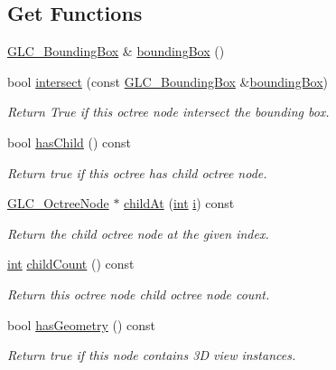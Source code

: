 \subsection*{Get Functions}
\begin{DoxyCompactItemize}
\item 
\hyperlink{class_g_l_c___bounding_box}{G\-L\-C\-\_\-\-Bounding\-Box} \& \hyperlink{class_g_l_c___octree_node_a6780e8d0e0921fc5b06f03ac7203fb32}{bounding\-Box} ()
\item 
bool \hyperlink{class_g_l_c___octree_node_a814178430344bc7b44f321d48d29043e}{intersect} (const \hyperlink{class_g_l_c___bounding_box}{G\-L\-C\-\_\-\-Bounding\-Box} \&\hyperlink{class_g_l_c___octree_node_a6780e8d0e0921fc5b06f03ac7203fb32}{bounding\-Box})
\begin{DoxyCompactList}\small\item\em Return True if this octree node intersect the bounding box. \end{DoxyCompactList}\item 
bool \hyperlink{class_g_l_c___octree_node_ac09f02f5e0cbcceed8763432ced8f670}{has\-Child} () const 
\begin{DoxyCompactList}\small\item\em Return true if this octree has child octree node. \end{DoxyCompactList}\item 
\hyperlink{class_g_l_c___octree_node}{G\-L\-C\-\_\-\-Octree\-Node} $\ast$ \hyperlink{class_g_l_c___octree_node_aeadda83184cd8feb9852355bfe5e9021}{child\-At} (\hyperlink{ioapi_8h_a787fa3cf048117ba7123753c1e74fcd6}{int} \hyperlink{uavobjecttemplate_8m_a6f6ccfcf58b31cb6412107d9d5281426}{i}) const 
\begin{DoxyCompactList}\small\item\em Return the child octree node at the given index. \end{DoxyCompactList}\item 
\hyperlink{ioapi_8h_a787fa3cf048117ba7123753c1e74fcd6}{int} \hyperlink{class_g_l_c___octree_node_a9be1b0349f206cf6e04252666693862a}{child\-Count} () const 
\begin{DoxyCompactList}\small\item\em Return this octree node child octree node count. \end{DoxyCompactList}\item 
bool \hyperlink{class_g_l_c___octree_node_af2fa3fbbd27c2a2b0594f4550dcd120b}{has\-Geometry} () const 
\begin{DoxyCompactList}\small\item\em Return true if this node contains 3\-D view instances. \end{DoxyCompactList}\item 

\end{DoxyCompactItemize}

